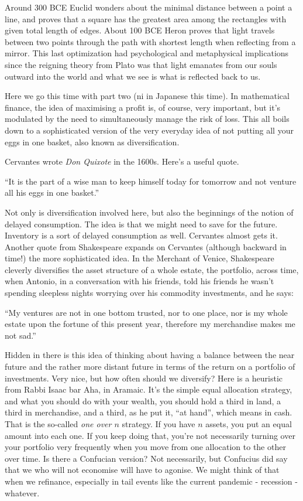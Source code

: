 \documentclass[
]{book}
\begin{document}
Around 300 BCE Euclid wonders about the minimal distance between a point a line, and proves that a square has the greatest area among the rectangles with given total length of edges. About 100 BCE Heron proves that light travels between two points through the path with shortest length when reflecting from a mirror. This last optimization had psychological and metaphysical implications since the reigning theory from Plato was that light emanates from our souls outward into the world and what we see is what is reflected back to us.

Here we go this time with part two (ni in Japanese this time). In mathematical
finance, the idea of maximising a profit is, of course, very important, but it's modulated by the need to simultaneously manage the risk of loss. This all boils down to a sophisticated version of the very everyday idea of not putting all your eggs in one basket, also known as diversification.

Cervantes wrote \emph{Don Quixote} in the 1600s. Here's a useful quote.

``It is the part of a wise man to keep himself today for tomorrow and not venture all his eggs in one basket.''

Not only is diversification involved here, but also the beginnings of the notion of delayed consumption. The idea is that we might need to save for the future. Inventory is a sort of delayed consumption as well. Cervantes almost gets it. Another quote from Shakespeare expands on Cervantes (although backward in time!) the more sophisticated idea. In the Merchant of Venice, Shakespeare cleverly diversifies the asset structure of a whole estate, the portfolio, across time, when Antonio, in a conversation with his friends, told his friends he wasn't spending sleepless nights worrying over his commodity investments, and he says:

``My ventures are not in one bottom trusted, nor to one place, nor is my whole estate upon the fortune of this present year, therefore my merchandise makes me not sad.''

Hidden in there is this idea of thinking about having a balance between the near future and the rather more distant future in terms of the return on a portfolio of investments. Very nice, but how often should we diversify? Here is a heuristic from Rabbi Isaac bar Aha, in Aramaic. It's the simple equal allocation strategy, and what you should do with your wealth, you should hold a third in land, a third in merchandise, and a third, as he put it, ``at hand'', which means in cash. That is the so-called \emph{one over \(n\)} strategy. If you have \(n\) assets, you put an equal amount into each one. If you keep doing that, you're not necessarily turning over your portfolio very frequently when you move from one allocation to the other over time. Is there a Confucian version? Not necessarily, but Confucius did say that we who will not economise will have to agonise. We might think of that when we refinance, especially in tail events like the current pandemic - recession - whatever.
\end{document}
